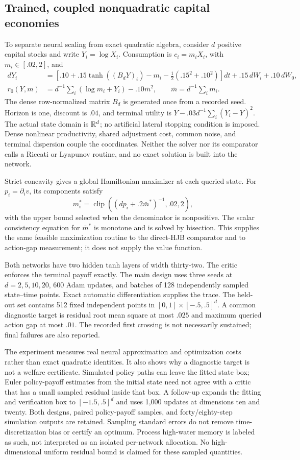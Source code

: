 \subsection{Trained, coupled nonquadratic capital economies}\label{sec:coupled-neural}
To separate neural scaling from exact quadratic algebra, consider $d$ positive capital stocks and write $Y_i=\log X_i$. Consumption is $c_i=m_iX_i$, with $m_i\in[.02,2]$, and
\begin{align}\label{eq:coupled-r6}
 dY_i&=\left[.10+.15\tanh((B_dY)_i)-m_i-\tfrac12(.15^2+.10^2)\right]dt
       +.15\,dW_i+.10\,dW_0,\\
 r_0(Y,m)&=d^{-1}\sum_i(\log m_i+Y_i)-.10\bar m^2,
 \qquad \bar m=d^{-1}\sum_i m_i.\nonumber
\end{align}
The dense row-normalized matrix $B_d$ is generated once from a recorded seed. Horizon is one, discount is $.04$, and terminal utility is $\bar Y-.03d^{-1}\sum_i(Y_i-\bar Y)^2$. The actual state domain is $\mathbb R^d$; no artificial lateral stopping condition is imposed. Dense nonlinear productivity, shared adjustment cost, common noise, and terminal dispersion couple the coordinates. Neither the solver nor its comparator calls a Riccati or Lyapunov routine, and no exact solution is built into the network.

Strict concavity gives a global Hamiltonian maximizer at each queried state. For $p_i=\partial_i v$, its components satisfy
\[
 m_i^*=\operatorname{clip}\left((dp_i+.2\bar m^*)^{-1},.02,2\right),
\]
with the upper bound selected when the denominator is nonpositive. The scalar consistency equation for $\bar m^*$ is monotone and is solved by bisection. This supplies the same feasible maximization routine to the direct-HJB comparator and to action-gap measurement; it does not supply the value function.

Both networks have two hidden tanh layers of width thirty-two. The critic enforces the terminal payoff exactly. The main design uses three seeds at $d=2,5,10,20$, 600 Adam updates, and batches of 128 independently sampled state--time points. Exact automatic differentiation supplies the trace. The held-out set contains 512 fixed independent points in $[0,1]\times[-.5,.5]^d$. A common diagnostic target is residual root mean square at most $.025$ and maximum queried action gap at most $.01$. The recorded first crossing is not necessarily sustained; final failures are also reported.

The experiment measures real neural approximation and optimization costs rather than exact quadratic identities. It also shows why a diagnostic target is not a welfare certificate. Simulated policy paths can leave the fitted state box; Euler policy-payoff estimates from the initial state need not agree with a critic that has a small sampled residual inside that box. A follow-up expands the fitting and verification box to $[-1.5,.5]^d$ and uses 1,000 updates at dimensions ten and twenty. Both designs, paired policy-payoff samples, and forty/eighty-step simulation outputs are retained. Sampling standard errors do not remove time-discretization bias or certify an optimum. Process high-water memory is labeled as such, not interpreted as an isolated per-network allocation. No high-dimensional uniform residual bound is claimed for these sampled quantities.
